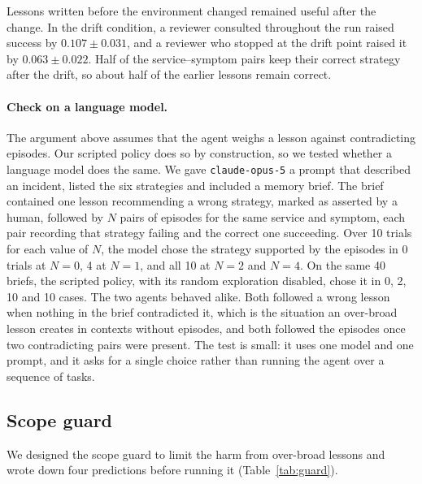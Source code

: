\documentclass{article}
\begin{document}
Lessons written before the environment changed remained useful after the change. In
the drift condition, a reviewer consulted throughout the run raised success by
$0.107 \pm 0.031$, and a reviewer who stopped at the drift point raised it by
$0.063 \pm 0.022$. Half of the service--symptom pairs keep their correct strategy after
the drift, so about half of the earlier lessons remain correct.

\paragraph{Check on a language model.}
The argument above assumes that the agent weighs a lesson against contradicting
episodes. Our scripted policy does so by construction, so we tested whether a language
model does the same. We gave \texttt{claude-opus-5} a prompt that described an incident,
listed the six strategies and included a memory brief. The brief contained one lesson
recommending a wrong strategy, marked as asserted by a human, followed by $N$ pairs of
episodes for the same service and symptom, each pair recording that strategy failing and
the correct one succeeding. Over 10 trials for each value of $N$, the model chose the
strategy supported by the episodes in 0 trials at $N = 0$, 4 at $N = 1$, and all 10 at
$N = 2$ and $N = 4$. On the same 40 briefs, the scripted policy, with its random
exploration disabled, chose it in 0, 2, 10 and 10 cases. The two agents behaved alike.
Both followed a wrong lesson when nothing in the brief contradicted it, which is the
situation an over-broad lesson creates in contexts without episodes, and both followed
the episodes once two contradicting pairs were present. The test is small: it uses one
model and one prompt, and it asks for a single choice rather than running the agent over
a sequence of tasks.

\subsection{Scope guard}
\label{sec:guard}

We designed the scope guard to limit the harm from over-broad lessons and wrote down four
predictions before running it (Table~\ref{tab:guard}).
\end{document}
